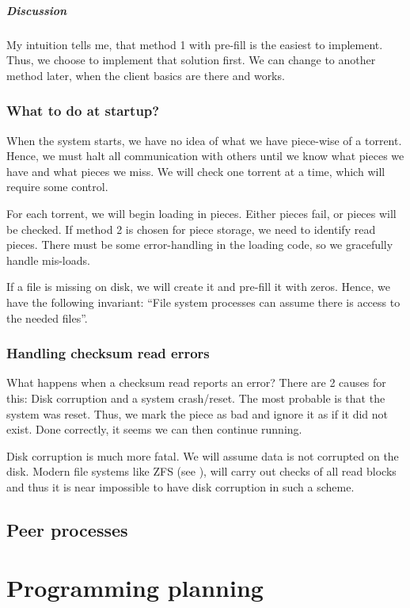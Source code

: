 \documentclass[a4paper]{memoir}
\begin{document}
\paragraph{Discussion}
My intuition tells me, that method 1 with pre-fill is the easiest to
implement. Thus, we choose to implement that solution first. We can
change to another method later, when the client basics are there and
works.

\subsection{What to do at startup?}
When the system starts, we have no idea of what we have piece-wise of
a torrent. Hence, we must halt all communication with others until we
know what pieces we have and what pieces we miss. We will check one
torrent at a time, which will require some control.

For each torrent, we will begin loading in pieces. Either pieces fail,
or pieces will be checked. If method 2 is chosen for piece storage, we
need to identify read pieces. There must be some error-handling in the
loading code, so we gracefully handle mis-loads.

If a file is missing on disk, we will create it and pre-fill it with
zeros. Hence, we have the following invariant: ``File system processes
can assume there is access to the needed files''.

\subsection{Handling checksum read errors}
What happens when a checksum read reports an error? There are 2 causes
for this: Disk corruption and a system crash/reset. The most probable
is that the system was reset. Thus, we mark the piece as bad and
ignore it as if it did not exist. Done correctly, it seems we can then
continue running.

Disk corruption is much more fatal. We will assume data is not
corrupted on the disk. Modern file systems like ZFS (see \cite{zfs}),
will carry out checks of all read blocks and thus it is near
impossible to have disk corruption in such a scheme.

\section{Peer processes}
\chapter{Programming planning}
\end{document}

